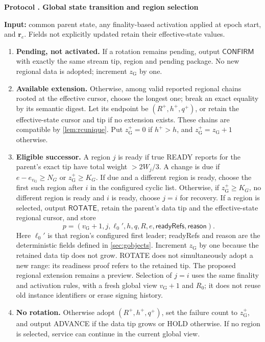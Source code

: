 \documentclass[11pt,a4paper,onecolumn]{article}
\newcommand{\gv}{v_{\mathrm G}}
\newcommand{\Tag}[1]{\mathsf{#1}}
\theoremstyle{remark}\newtheorem{example}[definition]{Example}
\newcounter{protocol}
\newenvironment{protocol}[2]{\refstepcounter{protocol}\label{#1}\begin{mdframed}[nobreak=true,linewidth=.6pt,skipabove=10pt,skipbelow=10pt,innertopmargin=8pt,innerbottommargin=8pt]\small\raggedright\noindent\textbf{Protocol \theprotocol. #2}\par\smallskip}{\end{mdframed}}
\begin{document}
\begin{protocol}{alg:gtransition}{Global state transition and region selection}
\textbf{Input:} common parent state, any finality-based activation applied at
epoch start, and $\mathbf r_e$. Fields not explicitly updated retain their
effective-state values.
\begin{enumerate}[label=\textbf{T\arabic*.}]
\item \textbf{Pending, not activated.} If a rotation remains pending, output
$\Tag{CONFIRM}$ with exactly the same stream tip, region and pending package.
No new regional data is adopted; increment $z_{\mathrm G}$ by one.
\item \textbf{Available extension.} Otherwise, among valid reported regional
chains rooted at the effective cursor, choose the longest one; break an exact
equality by its semantic digest. Let its endpoint be $(R^+,h^+,q^+)$, or retain
the effective-state cursor and tip if no extension exists. These chains are compatible by
\cref{lem:rcunique}. Put $z_{\mathrm G}^+=0$ if $h^+>h$, and $z_{\mathrm G}^+=z_{\mathrm G}+1$ otherwise.
\item \textbf{Eligible successor.} A region $j$ is ready if true READY
reports for the parent's exact tip have total weight $>2W_j/3$.
A change is due if $e-e_{\gv}\geq N_G$ or $z_{\mathrm G}^+\geq K_G$.
If due and a different region is ready, choose the first such region after $i$
in the configured cyclic list. Otherwise, if $z_{\mathrm G}^+\geq K_G$, no different region
is ready and $i$ is ready, choose $j=i$ for recovery. If a region is selected,
output $\Tag{ROTATE}$, retain the parent's data tip and the effective-state
regional cursor, and store
\[
 p=(\gv+1,j,\ell_0',h,q,R,e,\mathsf{readyRefs},\mathsf{reason}).
\]
Here $\ell_0'$ is that region's configured first leader; readyRefs and reason
are the deterministic fields defined in \cref{sec:gobjects}. Increment
$z_{\mathrm G}$ by one because the retained data tip does not grow. ROTATE does not
simultaneously adopt a new range: its readiness proof refers to the retained tip.
The proposed regional extension remains a preview. Selection of $j=i$ uses
the same finality and activation rules, with a fresh global view $\gv+1$ and $R_0$;
it does not reuse old instance identifiers or erase signing history.
\item \textbf{No rotation.} Otherwise adopt $(R^+,h^+,q^+)$, set the failure
count to $z_{\mathrm G}^+$, and output ADVANCE if the data tip grows or HOLD otherwise.
If no region is selected, service can continue in the current global view.
\end{enumerate}
\end{protocol}
\end{document}
